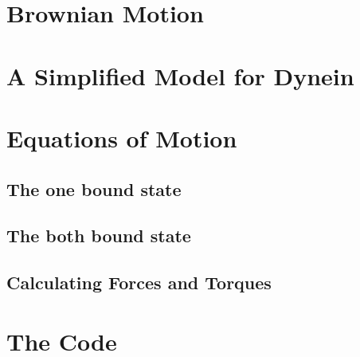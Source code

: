 \section{Brownian Motion}
\section{A Simplified Model for Dynein}
\section{Equations of Motion}
	\subsection{The one bound state}
	\subsection{The both bound state}
	\subsection{Calculating Forces and Torques}
\section{The Code}